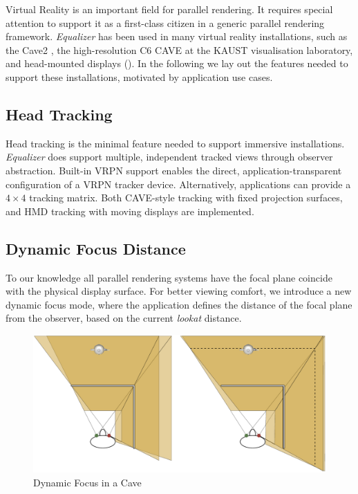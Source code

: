 Virtual Reality is an important field for parallel rendering. It requires
special attention to support it as a first-class citizen in a generic parallel
rendering framework. {\em Equalizer} has been used in many virtual reality
installations, such as the Cave2 \cite{FNTTL:13}, the high-resolution C6 CAVE
at the KAUST visualisation laboratory, and head-mounted displays
(). In the following we lay out the features needed to support
these installations, motivated by application use cases.

\subsection{Head Tracking}

Head tracking is the minimal feature needed to support immersive installations.
{\em Equalizer} does support multiple, independent tracked views through
observer abstraction. Built-in VRPN support enables the direct,
application-transparent configuration of a VRPN tracker device. Alternatively,
applications can provide a $4\times 4$ tracking matrix. Both CAVE-style tracking
with fixed projection surfaces, and HMD tracking with moving displays are
implemented.

\subsection{Dynamic Focus Distance}

To our knowledge all parallel rendering systems have the focal plane coincide
with the physical display surface. For better viewing comfort, we introduce a
new dynamic focus mode, where the application defines the distance of the focal
plane from the observer, based on the current \textit{lookat} distance.

\begin{figure}[h!t]\center
 \includegraphics[width=.9\textwidth]{images/focus}
 {\caption{\label{fFocus}Dynamic Focus in a Cave}}
\end{figure}

